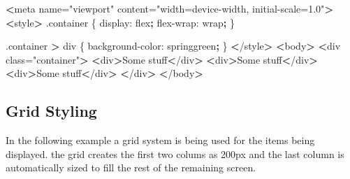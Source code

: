 \documentclass[]{book}
\newenvironment{Shaded}{\begin{snugshade}}{\end{snugshade}}
\newcommand{\KeywordTok}[1]{\textcolor[rgb]{0.13,0.29,0.53}{\textbf{#1}}}
\newcommand{\StringTok}[1]{\textcolor[rgb]{0.31,0.60,0.02}{#1}}
\newcommand{\OperatorTok}[1]{\textcolor[rgb]{0.81,0.36,0.00}{\textbf{#1}}}
\newcommand{\ExtensionTok}[1]{#1}
\newcommand{\NormalTok}[1]{#1}
\begin{document}
\begin{Shaded}
\begin{Highlighting}[]
\OperatorTok{<}\ExtensionTok{meta}\NormalTok{ name=}\StringTok{"viewport"}\NormalTok{ content=}\StringTok{"width=device-width, initial-scale=1.0"}\OperatorTok{>}
\OperatorTok{<}\ExtensionTok{style}\OperatorTok{>}
    \ExtensionTok{.container}\NormalTok{ \{}
        \ExtensionTok{display}\NormalTok{: flex}\KeywordTok{;}
        \ExtensionTok{flex-wrap}\NormalTok{: wrap}\KeywordTok{;}
\NormalTok{    \}}

    \ExtensionTok{.container} \OperatorTok{>}\NormalTok{ div \{}
        \ExtensionTok{background-color}\NormalTok{: springgreen}\KeywordTok{;}
\NormalTok{    \}}
\OperatorTok{<}\NormalTok{/}\ExtensionTok{style}\OperatorTok{>}
\OperatorTok{<}\ExtensionTok{body}\OperatorTok{>}
    \OperatorTok{<}\ExtensionTok{div}\NormalTok{ class=}\StringTok{"container"}\OperatorTok{>}
        \OperatorTok{<}\ExtensionTok{div}\OperatorTok{>}\NormalTok{Some stuff}\OperatorTok{<}\NormalTok{/div}\OperatorTok{>}
        \OperatorTok{<}\ExtensionTok{div}\OperatorTok{>}\NormalTok{Some stuff}\OperatorTok{<}\NormalTok{/div}\OperatorTok{>}
        \OperatorTok{<}\ExtensionTok{div}\OperatorTok{>}\NormalTok{Some stuff}\OperatorTok{<}\NormalTok{/div}\OperatorTok{>}
    \OperatorTok{<}\NormalTok{/}\ExtensionTok{div}\OperatorTok{>}
\OperatorTok{<}\NormalTok{/}\ExtensionTok{body}\OperatorTok{>}
\end{Highlighting}
\end{Shaded}

\subsection{Grid Styling}\label{grid-styling}

In the following example a grid system is being used for the items being
displayed. the grid creates the first two colums as 200px and the last
column is automatically sized to fill the rest of the remaining screen.
\end{document}
